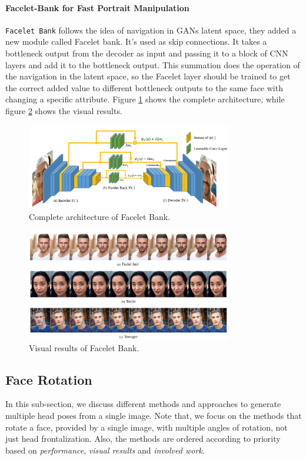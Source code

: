 \paragraph{Facelet-Bank for Fast Portrait Manipulation}
\texttt{Facelet Bank} \cite{chen2018faceletbank} follows the idea of navigation in GANs latent space, they added a new module called Facelet bank. It’s used as skip connections. It takes a bottleneck output from the decoder as input and passing it to a block of CNN layers and add it to the bottleneck output. This summation does the operation of the navigation in the latent space, so the Facelet layer should be trained to get the correct added value to different bottleneck outputs to  the same face with changing a specific attribute. Figure \ref{fig:facelet} shows the complete architecture, while figure \ref{fig:facelet_res} shows the visual results.

\begin{figure}[H]
    \centering
    \includegraphics[width=0.8\textwidth]{images/facelet.png}
    \caption{Complete architecture of Facelet Bank.}
    \label{fig:facelet}
\end{figure}

\begin{figure}[H]
    \centering
    \includegraphics[width=0.8\textwidth]{images/facelet-results.png}
    \caption{Visual results of Facelet Bank.}
    \label{fig:facelet_res}
\end{figure}

\subsection{Face Rotation}
In this sub-section, we discuss different methods and approaches to generate multiple head poses from a single image. Note that, we focus on the methods that rotate a face, provided by a single image, with multiple angles of rotation, not just head frontalization. Also, the methods are ordered according to priority based on \emph{performance}, \emph{visual results} and \emph{involved work}.

